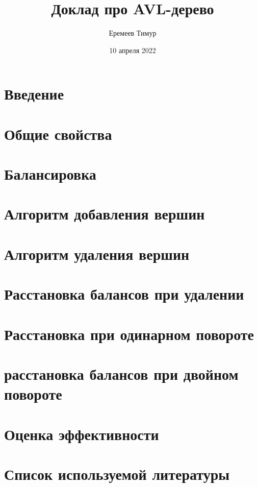 \documentclass[a4paper, 12pt]{article}
\begin{document}
    \title{Доклад про AVL-дерево}
    \author{Еремеев Тимур}
    \date{10 апреля 2022}

    \maketitle

    \tableofcontents

    \section*{Введение}
    

    \section*{Общие свойства}

    \section*{Балансировка}
    

    \section*{Алгоритм добавления вершин}
    

    \section*{Алгоритм удаления вершин}

    \section*{Расстановка балансов при удалении}

    \section*{Расстановка при одинарном повороте}

    \section*{расстановка балансов при двойном повороте}

    \section*{Оценка эффективности}

    \section{Список используемой литературы}
\end{document}
